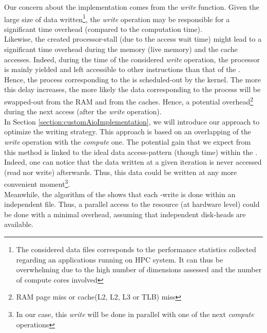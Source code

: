 	Our concern about the \toolTargetSoftware\space implementation comes from the \emph{write} function.   Given the large size of data written\footnote{The considered data files corresponds to the performance statistics collected regarding an applications running on HPC system.   It can thus be overwhelming due to the high number of dimensions assessed and the number of compute cores involved}, the \emph{write} operation may be responsible for a significant time overhead (compared to the computation time).\\
	Likewise, the created processor-stall (due to the \notationIO\space access wait time) might lead to a significant time overhead during the memory (live memory) and the cache accesses.   Indeed, during the time of the considered \emph{write} operation, the processor is mainly yielded and left accessible to other instructions than that of the \toolTargetSoftware.   Hence, the process corresponding to the \toolTargetSoftware\space is scheduled-out by the kernel.   The more this delay increases, the more likely the data corresponding to the \toolTargetSoftware\space process will be swapped-out from the RAM and from the caches.   Hence, a potential overhead\footnote{RAM page miss or cache(L2, L2, L3 or TLB) miss} during the next access (after the \emph{write} operation).\\

	In Section \ref{section:customAioImplementation}, we will introduce our approach to optimize the \toolTargetSoftware\space writing strategy.   This approach is based on an overlapping of the \emph{write} operation with the \emph{compute} one.   The potential gain that we expect from this method is linked to the ideal data access-pattern (though time) within the \toolTargetSoftware.\\
	Indeed, one can notice that the data written at a given iteration is never accessed (read nor write) afterwards.   Thus, this data could be written at any more convenient moment\footnote{In our case, this \emph{write} will be done in parallel with one of the next \emph{compute} operations}.\\
	Meanwhile, the algorithm of the \toolTargetSoftware\space shows that each \notationIO-write is done within an independent file.   Thus, a parallel access to the \notationIO\space resource (at hardware level) could be done with a minimal overhead, assuming that independent \notationIO\space disk-heads are available.\\

